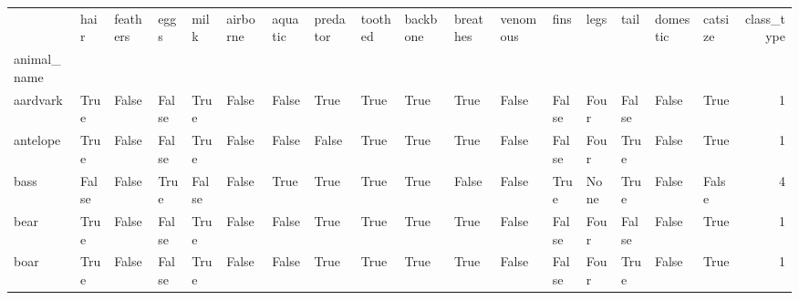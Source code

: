\begin{tabular}{lllllllllllllllllr}
\toprule
{} &   hair &  feathers &   eggs &   milk &  airborne &  aquatic &  predator &  toothed &  backbone &  breathes &  venomous &   fins &  legs &   tail &  domestic &  catsize &  class\_type \\
animal\_name &        &           &        &        &           &          &           &          &           &           &           &        &       &        &           &          &             \\
\midrule
aardvark    &   True &     False &  False &   True &     False &    False &      True &     True &      True &      True &     False &  False &  Four &  False &     False &     True &           1 \\
antelope    &   True &     False &  False &   True &     False &    False &     False &     True &      True &      True &     False &  False &  Four &   True &     False &     True &           1 \\
bass        &  False &     False &   True &  False &     False &     True &      True &     True &      True &     False &     False &   True &  None &   True &     False &    False &           4 \\
bear        &   True &     False &  False &   True &     False &    False &      True &     True &      True &      True &     False &  False &  Four &  False &     False &     True &           1 \\
boar        &   True &     False &  False &   True &     False &    False &      True &     True &      True &      True &     False &  False &  Four &   True &     False &     True &           1 \\
\bottomrule
\end{tabular}
